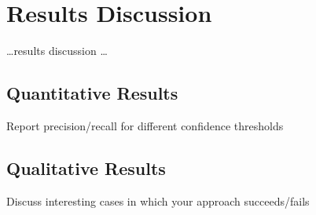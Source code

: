 \chapter{Results Discussion}

\dots results discussion \dots 

\section{Quantitative Results}
Report precision/recall for different confidence thresholds


\section{Qualitative Results}
Discuss interesting cases in which your approach succeeds/fails

